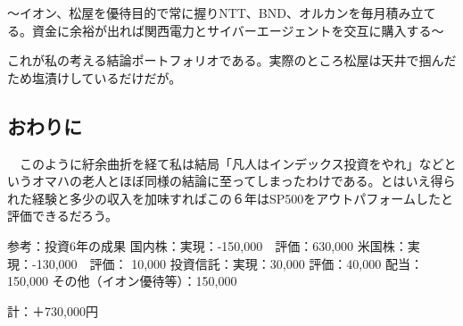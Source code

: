 ～イオン、松屋を優待目的で常に握りNTT、BND、オルカンを毎月積み立てる。資金に余裕が出れば関西電力とサイバーエージェントを交互に購入する～

これが私の考える結論ポートフォリオである。実際のところ松屋は天井で掴んだため塩漬けしているだけだが。


\subsection{おわりに}

　このように紆余曲折を経て私は結局「凡人はインデックス投資をやれ」などというオマハの老人とほぼ同様の結論に至ってしまったわけである。とはいえ得られた経験と多少の収入を加味すればこの６年はSP500をアウトパフォームしたと評価できるだろう。

参考：投資6年の成果
国内株：実現：-150,000　評価：630,000
米国株：実現：-130,000　評価： 10,000
投資信託：実現：30,000 評価：40,000
配当：150,000
その他（イオン優待等）：150,000

計：＋730,000円